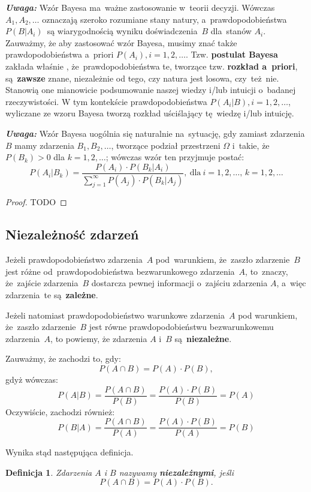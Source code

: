 \documentclass[10pt,a4paper]{article}
\newtheorem{definition}{Definicja}[section]
\newcommand{\Warning}{\marginpar{\dbend}\textbf{\textit{Uwaga: }}}
\numberwithin{equation}{subsection}
\begin{document}
\Warning Wzór Bayesa ma~ważne zastosowanie w~teorii decyzji. Wówczas
$A_1,A_2,\dotsc$ oznaczają szeroko rozumiane stany natury, a~prawdopodobieństwa
$P(B|A_i)$~są wiarygodnością wyniku doświadczenia~$B$ dla~stanów $A_i$. Zauważmy,
że aby zastosować wzór Bayesa, musimy znać także prawdopodobieństwa a~priori
$P(A_i), i=1,2,\dotsc$. Tzw. \textbf{postulat Bayesa} zakłada właśnie
, że~prawdopodobieństwa te, tworzące tzw. \textbf{rozkład a~priori},
są~\textbf{zawsze} znane, niezależnie od tego, czy natura jest losowa,
czy~też~nie. Stanowią one mianowicie podsumowanie naszej wiedzy i/lub
intuicji o~badanej rzeczywistości. W tym kontekście prawdopodobieństwa
$P(A_i|B), i=1,2,\dotsc$, wyliczane ze wzoru Bayesa tworzą rozkład uściślający
tę~wiedzę i/lub intuicję.

\Warning Wzór Bayesa uogólnia się naturalnie
na~sytuację, gdy zamiast zdarzenia $B$ mamy zdarzenia $B_1,B_2,\dotsc$, tworzące
podział przestrzeni $\Omega$ i~takie, że $P(B_k)>0$ dla $k=1,2,\dotsc$; wówczas
wzór ten przyjmuje postać:
\begin{equation}
  P(A_i|B_k) = \frac{P(A_i)\cdot P(B_k|A_i)}{\sum_{j=1}^{\infty}P(A_j)\cdot
    P(B_k|A_j)},\:\textrm{dla}\:i=1,2,\dotsc,\,k=1,2,\dotsc
\end{equation}
\begin{proof}
  TODO
\end{proof}

\subsection{Niezależność zdarzeń}
Jeżeli prawdopodobieństwo zdarzenia~$A$ pod~warunkiem, że~zaszło zdarzenie~$B$
jest różne od~prawdopodobieństwa bezwarunkowego zdarzenia~$A$, to~znaczy,
że~zajście zdarzenia~$B$ dostarcza pewnej informacji o~zajściu zdarzenia $A$,
a~więc zdarzenia~te są~\textbf{zależne}.

Jeżeli natomiast prawdopodobieństwo warunkowe zdarzenia~$A$ pod warunkiem,
że~zaszło zdarzenie~$B$ jest równe prawdopodobieństwu bezwarunkowemu
zdarzenia~$A$, to powiemy, że zdarzenia $A$ i~$B$ są~\textbf{niezależne}.

Zauważmy, że zachodzi to, gdy:
\[
  P(A\cap B) = P(A)\cdot P(B),
\]
gdyż wówczas:
\[
  P(A|B)=\frac{P(A\cap B)}{P(B)}=\frac{P(A)\cdot P(B)}{P(B)} = P(A)
\]
Oczywiście, zachodzi również:
\[
  P(B|A)=\frac{P(A\cap B)}{P(A)}=\frac{P(A)\cdot P(B)}{P(A)} = P(B)
\]

Wynika stąd następująca definicja.

\begin{definition}
  Zdarzenia $A$ i $B$ nazywamy \textbf{niezależnymi}, jeśli
  \begin{equation}
    P(A\cap B)=P(A)\cdot P(B).
  \end{equation}
\end{definition}
\end{document}

